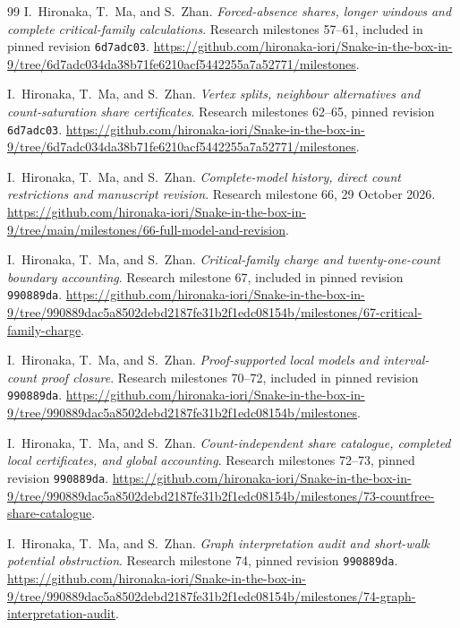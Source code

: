 \documentclass[11pt,a4paper]{article}
\theoremstyle{definition}
\theoremstyle{remark}
\begin{document}
\begin{thebibliography}{99}
I.~Hironaka, T.~Ma, and S.~Zhan. \emph{Forced-absence shares, longer windows and complete critical-family calculations}. Research milestones 57--61, included in pinned revision \texttt{6d7adc03}.
\url{https://github.com/hironaka-iori/Snake-in-the-box-in-9/tree/6d7adc034da38b71fe6210acf5442255a7a52771/milestones}.

I.~Hironaka, T.~Ma, and S.~Zhan. \emph{Vertex splits, neighbour alternatives and count-saturation share certificates}. Research milestones 62--65, pinned revision \texttt{6d7adc03}.
\url{https://github.com/hironaka-iori/Snake-in-the-box-in-9/tree/6d7adc034da38b71fe6210acf5442255a7a52771/milestones}.

I.~Hironaka, T.~Ma, and S.~Zhan. \emph{Complete-model history, direct count restrictions and manuscript revision}. Research milestone 66, 29 October 2026.
\url{https://github.com/hironaka-iori/Snake-in-the-box-in-9/tree/main/milestones/66-full-model-and-revision}.

I.~Hironaka, T.~Ma, and S.~Zhan. \emph{Critical-family charge and twenty-one-count boundary accounting}. Research milestone 67, included in pinned revision \texttt{990889da}.
\url{https://github.com/hironaka-iori/Snake-in-the-box-in-9/tree/990889dac5a8502debd2187fe31b2f1edc08154b/milestones/67-critical-family-charge}.

I.~Hironaka, T.~Ma, and S.~Zhan. \emph{Proof-supported local models and interval-count proof closure}. Research milestones 70--72, included in pinned revision \texttt{990889da}.
\url{https://github.com/hironaka-iori/Snake-in-the-box-in-9/tree/990889dac5a8502debd2187fe31b2f1edc08154b/milestones}.

I.~Hironaka, T.~Ma, and S.~Zhan. \emph{Count-independent share catalogue, completed local certificates, and global accounting}. Research milestones 72--73, pinned revision \texttt{990889da}.
\url{https://github.com/hironaka-iori/Snake-in-the-box-in-9/tree/990889dac5a8502debd2187fe31b2f1edc08154b/milestones/73-countfree-share-catalogue}.

I.~Hironaka, T.~Ma, and S.~Zhan. \emph{Graph interpretation audit and short-walk potential obstruction}. Research milestone 74, pinned revision \texttt{990889da}.
\url{https://github.com/hironaka-iori/Snake-in-the-box-in-9/tree/990889dac5a8502debd2187fe31b2f1edc08154b/milestones/74-graph-interpretation-audit}.


\end{thebibliography}
\end{document}
